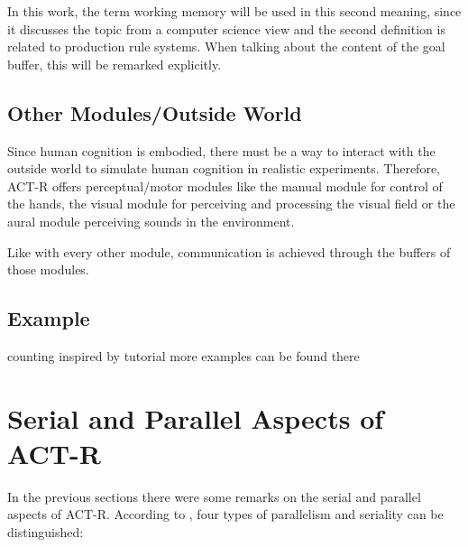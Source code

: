 In this work, the term working memory will be used in this second meaning, since it discusses the topic from a computer science view and the second definition is related to production rule systems. When talking about the content of the goal buffer, this will be remarked explicitly.

\subsection{Other Modules/Outside World}

Since human cognition is embodied, there must be a way to interact with the outside world to simulate human cognition in realistic experiments. Therefore, ACT-R offers perceptual/motor modules like the manual module for control of the hands, the visual module for perceiving and processing the visual field or the aural module perceiving sounds in the environment.

Like with every other module, communication is achieved through the buffers of those modules. 


\subsection{Example}

counting
inspired by tutorial
more examples can be found there

\section{Serial and Parallel Aspects of ACT-R}

In the previous sections there were some remarks on the serial and parallel aspects of ACT-R. According to \cite[p. 68]{anderson_how_2007}, four types of parallelism and seriality can be distinguished:

